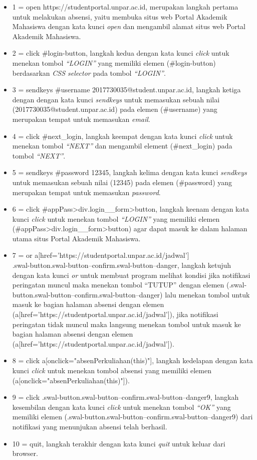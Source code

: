 \begin{itemize}
	\item 1 = open https://studentportal.unpar.ac.id, merupakan langkah pertama untuk melakukan absensi, yaitu membuka situs web Portal Akademik Mahasiswa dengan kata kunci \textit{open} dan mengambil alamat situs web Portal Akademik Mahasiswa.
	\item 2 = click \#login-button, langkah kedua dengan kata kunci \textit{click} untuk menekan tombol \textit{``LOGIN''} yang memiliki elemen (#login-button) berdasarkan \textit{CSS selector} pada tombol \textit{``LOGIN''}.
	\item 3 = sendkeys \#username 2017730035@student.unpar.ac.id, langkah ketiga dengan dengan kata kunci \textit{sendkeys} untuk memasukan sebuah nilai (2017730035@student.unpar.ac.id) pada elemen (\#username) yang merupakan tempat untuk memasukan \textit{email}.
	\item 4 = click \#next\_login, langkah keempat dengan kata kunci \textit{click} untuk menekan tombol \textit{``NEXT''} dan mengambil element (\#next\_login) pada tombol \textit{``NEXT''}.
	\item 5 = sendkeys \#password 12345, langkah kelima dengan kata kunci \textit{sendkeys} untuk memasukan sebuah nilai (12345) pada elemen (\#password) yang merupakan tempat untuk memasukan \textit{password}.
	\item 6 = click \#appPass>div.login\_\_form>button, langkah keenam dengan kata kunci \textit{click} untuk menekan tombol \textit{``LOGIN''} yang memiliki elemen (\#appPass>div.login\_\_form>button) agar dapat masuk ke dalam halaman utama situs Portal Akademik Mahasiswa. 
	\item 7 = or a[href='https://studentportal.unpar.ac.id/jadwal'] \\ .swal-button.swal-button--confirm.swal-button--danger, langkah ketujuh dengan kata kunci \textit{or} untuk membuat program melihat kondisi jika notifikasi peringatan muncul maka menekan tombol ``TUTUP'' dengan elemen (.swal-button.swal-button--confirm.swal-button--danger) lalu menekan tombol untuk masuk ke bagian halaman absensi dengan elemen (a[href='https://studentportal.unpar.ac.id/jadwal']), jika notifikasi peringatan tidak muncul maka langsung menekan tombol untuk masuk ke bagian halaman absensi dengan elemen \\ (a[href='https://studentportal.unpar.ac.id/jadwal']).
	\item 8 = click a[onclick="absenPerkuliahan(this)"], langkah kedelapan dengan kata kunci \textit{click} untuk menekan tombol absensi yang memiliki elemen (a[onclick="absenPerkuliahan(this)"]).
	\item 9 = click .swal-button.swal-button--confirm.swal-button--danger9, langkah kesembilan dengan kata kunci \textit{click} untuk menekan tombol \textit{``OK''} yang memiliki elemen (.swal-button.swal-button--confirm.swal-button--danger9) dari notifikasi yang menunjukan absensi telah berhasil.
	\item 10 = quit, langkah terakhir dengan kata kunci \textit{quit} untuk keluar dari browser.
\end{itemize}

